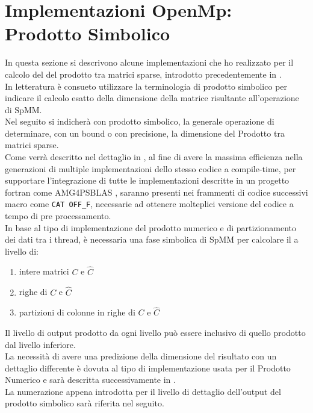 \chapter[Implementazioni OpenMp: Prodotto Simbolico]
{Implementazioni OpenMp:\\Prodotto Simbolico}
\label{ChSymbProduct}\label{chSpMMSymb}
In questa sezione si descrivono alcune implementazioni che ho realizzato per 
il calcolo del \nnnz del prodotto tra matrici sparse, introdotto precedentemente in .\\
In letteratura è consueto utilizzare la terminologia di prodotto simbolico 
per indicare il calcolo esatto della dimensione della matrice risultante all'operazione di SpMM.\\
Nel seguito si indicherà con prodotto simbolico, la generale operazione di determinare, 
con un bound o con precisione, la dimensione del Prodotto tra matrici sparse.\\
Come verrà descritto nel dettaglio in , 
al fine di avere la massima efficienza nella generazioni
di multiple implementazioni dello stesso codice a compile-time, 
per supportare l'integrazione di tutte le implementazioni descritte in un progetto fortran come AMG4PSBLAS  \amgforpsblas,
saranno presenti nei frammenti di codice successivi macro come \verb|CAT OFF_F|,
necessarie ad ottenere molteplici versione del codice a tempo di pre processamento.\\
\voidLine
\label{chSpMMSymb:outputDetailLevel} %
In base al tipo di implementazione del prodotto numerico e di partizionamento dei dati tra i thread,
è necessaria una fase simbolica di SpMM per calcolare il \nnnz a livello di:\\
\begin{enumerate}
	\item	
		intere matrici $C$ e $\hat{C}$
	\item 	righe di $C$ e $\hat{C}$
	\item 	partizioni di colonne in righe di $C$ e $\hat{C}$
\end{enumerate}
Il livello di output prodotto da ogni livello può essere inclusivo di quello prodotto dal livello inferiore.\\
La necessità di avere una predizione della dimensione del risultato con un dettaglio differente 
è dovuta al tipo di implementazione usata per il Prodotto Numerico e 
sarà descritta successivamente in .\\
La numerazione appena introdotta per il livello di dettaglio dell'output del prodotto simbolico 
sarà riferita nel seguito.\\

